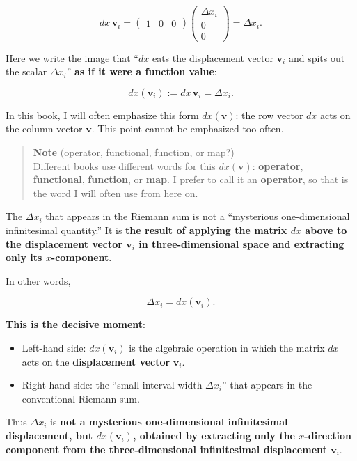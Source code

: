 \documentclass[a4paper,12pt,openany]{book}
\begin{document}
\[
dx\,\mathbf{v}_i
=
\begin{pmatrix} 1 & 0 & 0 \end{pmatrix}
\begin{pmatrix} \Delta x_i \\ 0 \\ 0 \end{pmatrix}
=
\Delta x_i.
\]

Here we write the image that ``\(dx\) eats the displacement vector
\(\mathbf{v}_i\) and spits out the scalar \(\Delta x_i\)''
\textbf{as if it were a function value}:

\[
dx(\mathbf{v}_i)
:=
dx\,\mathbf{v}_i
=
\Delta x_i.
\]

In this book, I will often emphasize this form \(dx(\mathbf{v})\): the
row vector \(dx\) acts on the column vector \(\mathbf{v}\). This point
cannot be emphasized too often.

\begin{quote}
\textbf{Note} (operator, functional, function, or map?)\\
Different books use different words for this \(dx(\mathbf{v})\):
\textbf{operator}, \textbf{functional}, \textbf{function}, or
\textbf{map}. I prefer to call it an \textbf{operator}, so that is the
word I will often use from here on.
\end{quote}

The \(\Delta x_i\) that appears in the Riemann sum is not a ``mysterious
one-dimensional infinitesimal quantity.'' It is
\textbf{the result of applying the matrix $dx$ above to the displacement vector $\mathbf{v}_i$ in three-dimensional space and extracting only its $x$-component}.

In other words,

\[
\Delta x_i = dx(\mathbf{v}_i).
\]

\textbf{This is the decisive moment}:

\begin{itemize}
\item
  Left-hand side: \(dx(\mathbf{v}_i)\) is the algebraic operation in
  which the matrix \(dx\) acts on the \textbf{displacement vector}
  \(\mathbf{v}_i\).
\item
  Right-hand side: the ``small interval width \(\Delta x_i\)'' that
  appears in the conventional Riemann sum.
\end{itemize}

Thus \(\Delta x_i\) is
\textbf{not a mysterious one-dimensional infinitesimal displacement, but $dx(\mathbf{v}_i)$, obtained by extracting only the $x$-direction component from the three-dimensional infinitesimal displacement $\mathbf{v}_i$}.
\end{document}
